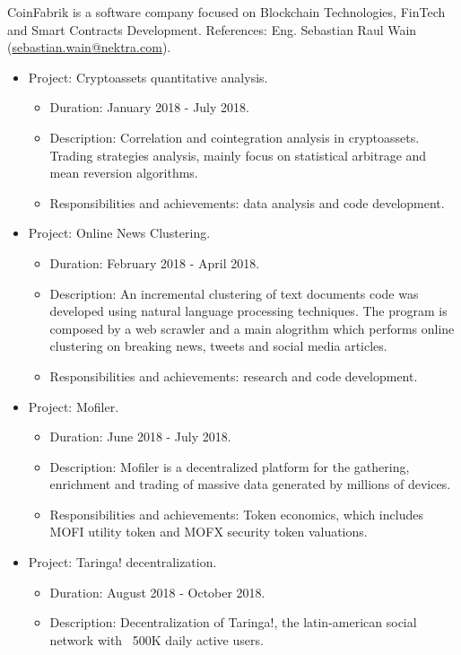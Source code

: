 \documentclass[11pt,a4paper,sans]{moderncv}        %
\begin{document}
{CoinFabrik is a software company focused on Blockchain Technologies, FinTech and Smart Contracts Development.
References: Eng. Sebastian Raul Wain (\href{mailto:sebastian.wain@nektra.com}{sebastian.wain@nektra.com}).
\begin{itemize}%
\item Project: Cryptoassets quantitative analysis.
	\begin{itemize}%
	\item Duration: January 2018 - July 2018.
	\item Description: Correlation and cointegration analysis in cryptoassets. 
	Trading strategies analysis, mainly focus on statistical arbitrage and mean reversion algorithms.
	\item Responsibilities and achievements: data analysis and code development.
	\end{itemize}
\item Project: Online News Clustering.
	\begin{itemize}%
	\item Duration: February 2018 - April 2018.
	\item Description: An incremental clustering of text documents code was developed using natural language processing techniques.
	The program is composed by a web scrawler and a main alogrithm which performs online clustering on breaking news,
	tweets and social media articles.
	\item Responsibilities and achievements: research and code development.
	\end{itemize}
\item Project: Mofiler.
	\begin{itemize}%
	\item Duration: June 2018 - July 2018.
	\item Description: Mofiler is a decentralized platform for the gathering, enrichment and trading of
	massive data generated by millions of devices.
	\item Responsibilities and achievements: Token economics, which includes MOFI utility token and MOFX security token valuations.
	\end{itemize}
\item Project: Taringa! decentralization.
	\begin{itemize}%
	\item Duration: August 2018 - October 2018.
	\item Description: Decentralization of Taringa!, the latin-american social network with ~500K daily active users.

\end{itemize}
\end{itemize}}
\end{document}
